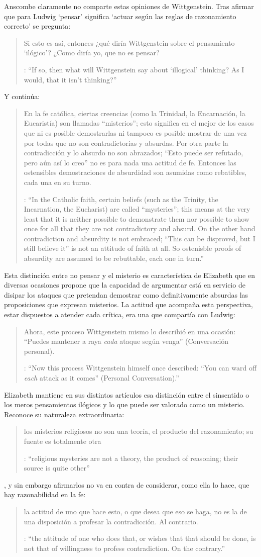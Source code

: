 Anscombe claramente no comparte estas opiniones de Wittgenstein. Tras afirmar que para Ludwig `pensar' significa \enquote*{actuar según las reglas de razonamiento correcto} se pregunta: \blockquote[{\cite[122]{anscombe1981parmenides:qli}}: \enquote{If so, then what will Wittgenstein say about `illogical' thinking? As I would, that it isn't thinking?}]{Si esto es así, entonces ¿qué diría Wittgenstein sobre el pensamiento `ilógico'? ¿Como diría yo, que no es pensar?} Y continúa: \blockquote[{\cite[122]{anscombe1981parmenides:qli}}: \enquote{In the Catholic faith, certain beliefs (such as the Trinity, the Incarnation, the Eucharist) are called ``mysteries''; this means at the very least that it is neither possible to demonstrate them nor possible to show once for all that they are not contradictory and absurd. On the other hand contradiction and absurdity is not embraced; ``This can be disproved, but I still believe it'' is not an attitude of faith at all. So ostenisble proofs of absurdity are assumed to be rebuttable, each one in turn.}]{En la fe católica, ciertas creencias (como la Trinidad, la Encarnación, la Eucaristía) son llamadas ``misterios''; esto significa en el mejor de los casos que ni es posible demostrarlas ni tampoco es posible mostrar de una vez por todas que no son contradictorias y absurdas. Por otra parte la contradicción y lo absurdo no son abrazados; ``Esto puede ser refutado, pero aún así lo creo'' no es para nada una actitud de fe. Entonces las ostensibles demostraciones de absurdidad son asumidas como rebatibles, cada una en su turno.} Esta distinción entre no pensar y el misterio es característica de Elizabeth que en diversas ocasiones propone que la capacidad de argumentar está en servicio de disipar los ataques que pretendan demostrar como definitivamente absurdas las proposiciones que expresan misterios. La actitud que acompaña esta perspectiva, estar dispuestos a atender cada crítica, era una que compartía con Ludwig: \blockquote[{\cite[122]{anscombe1981parmenides:qli}}: \enquote{Now this process Wittgenstein himself once described: ``You can ward off \emph{each} attack as it comes'' (Personal Conversation).}]{Ahora, este proceso Wittgenstein mismo lo describió en una ocasión: ``Puedes mantener a raya \emph{cada} ataque según venga'' (Conversación personal).}

Elizabeth mantiene en sus distintos artículos esa distinción entre el sinsentido o los meros pensamientos ilógicos y lo que puede ser valorado como un misterio. Reconoce su naturaleza extraordinaria: \blockquote[{\cite[122--123]{anscombe1981parmenides:qli}}: \enquote{religious mysteries are not a theory, the product of reasoning; their source is quite other}]{los misterios religiosos no son una teoría, el producto del razonamiento; su fuente es totalmente otra}, y sin embargo afirmarlos no va en contra de considerar, como ella lo hace, que hay razonabilidad en la fe: \blockquote[{\cite[122]{anscombe1981parmenides:qli}}: \enquote{the attitude of one who does that, or wishes that that should be done, is not that of willingness to profess contradiction. On the contrary.}]{la actitud de uno que hace esto, o que desea que eso se haga, no es la de una disposición a profesar la contradicción. Al contrario.}
